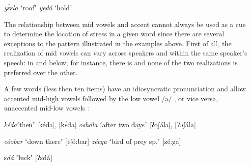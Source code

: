 \documentclass[output=paper]{LSP/langsci}
\begin{document}
\begin{exe}
\ex \begin{xlist}
    \ex \textit{yɛ́ɛla}\hspace{10mm} ʻroofʼ \label{ex:Petrollino:roof}
    \ex \textit{yedá}\hspace{11mm} ʻholdʼ \label{ex:Petrollino:hold}
\end{xlist}
\end{exe}
The relationship between mid vowels and accent cannot always be used as a cue to determine the location of stress in a given word since there are several exceptions to the pattern illustrated in the examples above. First of all, the realization of mid vowels can vary across speakers and within the same speaker's speech: in  and  below, for instance, there is  and none of the two realizations is preferred over the other. 

A few words (less then ten items) have an idiosyncratic pronunciation and allow accented mid-high vowels followed by the low vowel /a/ , or vice versa, unaccented mid-low vowels :

\begin{exe}
	\ex \begin{xlist}
	\ex \textit{kéda}\hspace{8mm}ʻthenʼ\hspace{19mm} [kéda], [kɛ́da] \label{ex:Petrollino:keda}
    \ex \textit{oshála}\hspace{5mm} ʻafter two daysʼ\hspace{3mm} [ʔoʃála], [ʔɔʃála] \label{ex:Petrollino:oshala}
    \end{xlist}
\end{exe}

\begin{exe}
	\ex \begin{xlist} \label{ex:Petrollino:coobar} 
    \ex \textit{cóobar}\hspace{5mm} ʻdown thereʼ\hspace{7mm} [tʃó:bar] 
    \ex \textit{zéega}\hspace{7mm} ʻbird of prey sp.ʼ \hspace{1mm}[zé:ga] 
    \end{xlist}
\end{exe}
    
\begin{exe}
    \ex \textit{ɛdá}\hspace{17mm} ʻluckʼ\hspace{18mm} [ʔɛdá] \label{ex:Petrollino:ɛda}
\end{exe}
\end{document}
